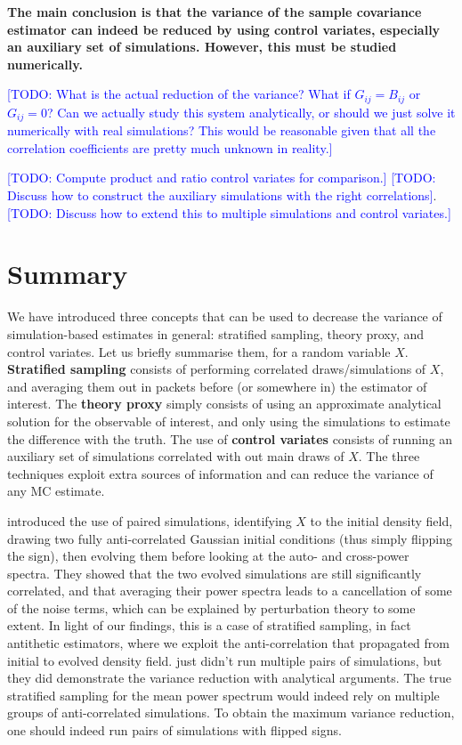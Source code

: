 \documentclass{aastex6}
\newcommand{\todo}[1]{\textcolor{blue}{[TODO: #1]}}
\begin{document}
\textbf{The main conclusion is that the variance of the sample covariance estimator can indeed be reduced by using control variates, especially an auxiliary set of simulations. However, this must be studied numerically.}

\todo{What is the actual reduction of the variance? What if $G_{ij}=B_{ij}$ or $G_{ij} = 0$? Can we actually study this system analytically, or should we just solve it numerically with real simulations? This would be reasonable given that all the correlation coefficients are pretty much unknown in reality.}


\todo{Compute product and ratio control variates for comparison.}
\todo{Discuss how to construct the auxiliary simulations with the right correlations}.
\todo{Discuss how to extend this to multiple simulations and control variates.}


\section{Summary}

We have introduced three concepts that can be used to decrease the variance of simulation-based estimates in general: stratified sampling, theory proxy, and control variates. 
Let us briefly summarise them, for a random variable $X$.
\textbf{Stratified sampling} consists of performing correlated draws/simulations of $X$, and averaging them out in packets before (or somewhere in) the estimator of interest. 
The \textbf{theory proxy} simply consists of using an approximate analytical solution for the observable of interest, and only using the simulations to estimate the difference with the truth. 
The use of \textbf{control variates} consists of running an auxiliary set of simulations correlated with out main draws of $X$.
The three techniques exploit extra sources of information and can reduce the variance of any MC estimate. 

\cite{PontzenEtAl2016} introduced the use of paired simulations, identifying $X$ to the initial density field, drawing two fully anti-correlated Gaussian initial conditions (thus simply flipping the sign), then evolving them before looking at the auto- and cross-power spectra.
They showed that the two evolved simulations are still significantly correlated, and that averaging their power spectra leads to a cancellation of some of the noise terms, which can be explained by perturbation theory to some extent. 
In light of our findings, this is a case of stratified sampling, in fact antithetic estimators, where we exploit the anti-correlation that propagated from initial to evolved density field. 
\cite{PontzenEtAl2016} just didn't run multiple pairs of simulations, but they did demonstrate the variance reduction with analytical arguments.
The true stratified sampling for the mean power spectrum would indeed rely on multiple groups of anti-correlated simulations. To obtain the maximum variance reduction, one should indeed run pairs of simulations with flipped signs.
\end{document}
